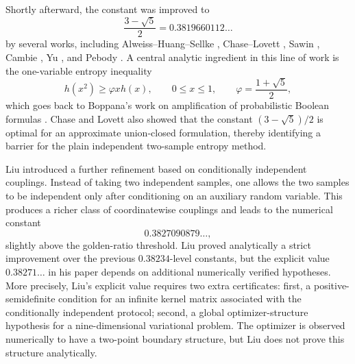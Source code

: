 Shortly afterward, the constant was improved to
\begin{equation}
  \frac{3-\sqrt 5}{2}=0.3819660112\ldots
\end{equation}
by several works, including Alweiss--Huang--Sellke
\cite{AlweissHuangSellke2024}, Chase--Lovett \cite{ChaseLovett2022}, Sawin
\cite{Sawin2022}, Cambie \cite{Cambie2022}, Yu \cite{Yu2023}, and Pebody
\cite{Pebody2022}.  A central analytic ingredient in this line of work is the
one-variable entropy inequality
\begin{equation}\label{eq:intro_boppana}
  h(x^2)\ge \varphi xh(x),
  \qquad
  0\le x\le1,
  \qquad
  \varphi=\frac{1+\sqrt5}{2},
\end{equation}
which goes back to Boppana's work on amplification of probabilistic Boolean
formulas \cite{Boppana1985}.  Chase and Lovett also showed that the constant
\((3-\sqrt5)/2\) is optimal for an approximate union-closed formulation,
thereby identifying a barrier for the plain independent two-sample entropy
method.

Liu \cite{Liu2023} introduced a further refinement based on conditionally
independent couplings.  Instead of taking two independent samples, one allows
the two samples to be independent only after conditioning on an auxiliary
random variable.  This produces a richer class of coordinatewise couplings and
leads to the numerical constant
\begin{equation}
  0.3827090879\ldots,
\end{equation}
slightly above the golden-ratio threshold.  Liu proved analytically a strict
improvement over the previous \(0.38234\)-level constants, but the explicit
value \(0.38271\ldots\) in his paper depends on additional numerically verified
hypotheses.  More precisely, Liu's explicit value requires two extra
certificates: first, a positive-semidefinite condition for an infinite kernel
matrix associated with the conditionally independent protocol; second, a
global optimizer-structure hypothesis for a nine-dimensional variational
problem.  The optimizer is observed numerically to have a two-point boundary
structure, but Liu does not prove this structure analytically.

